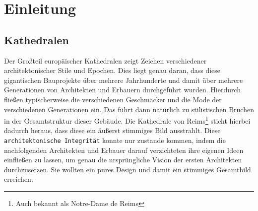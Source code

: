 \documentclass[a4paper, ngerman, 12pt, usenames, dvipsnames]{article}
\begin{document}
\tableofcontents
\thispagestyle{empty}
\pagebreak

\section{Einleitung}
\subsection{Kathedralen}
Der Großteil europäischer Kathedralen zeigt Zeichen verschiedener architektonischer Stile und Epochen.
Dies liegt genau daran, dass diese gigantischen Bauprojekte über mehrere Jahrhunderte und damit über mehrere Generationen von Architekten und Erbauern durchgeführt wurden.
Hierdurch fließen typischerweise die verschiedenen Geschmäcker und die Mode der verschiedenen Generationen ein.
Das führt dann natürlich zu stilistischen Brüchen in der Gesamtstruktur dieser Gebäude.
Die Kathedrale von Reims\footnote{Auch bekannt als Notre-Dame de Reims} sticht hierbei dadurch heraus, dass diese ein äußerst stimmiges Bild ausstrahlt.
Diese \texttt{architektonische Integrität} konnte nur zustande kommen, indem die nachfolgenden Architekten und Erbauer darauf verzichteten ihre eigenen Ideen einfließen zu lassen, um genau die ursprüngliche Vision der ersten Architekten durchzusetzen. Sie wollten ein pures Design und damit ein stimmiges Gesamtbild erreichen. \cite{Brooks1975}
\end{document}
